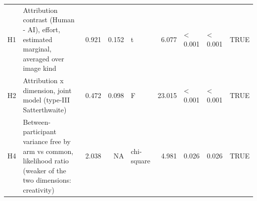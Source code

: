 \begin{table}[!h]
{\begin{tabular}[t]{l>{\raggedright\arraybackslash}p{5cm}rrlrlll}
H1 & Attribution contrast (Human - AI), effort, estimated marginal, averaged over image kind & 0.921 & 0.152 & t & 6.077 & < 0.001 & < 0.001 & TRUE\\
H2 & Attribution x dimension, joint model (type-III Satterthwaite) & 0.472 & 0.098 & F & 23.015 & < 0.001 & < 0.001 & TRUE\\
H4 & Between-participant variance free by arm vs common, likelihood ratio (weaker of the two dimensions: creativity) & 2.038 & NA & chi-square & 4.981 & 0.026 & 0.026 & TRUE\\
\bottomrule
\end{tabular}}
\end{table}